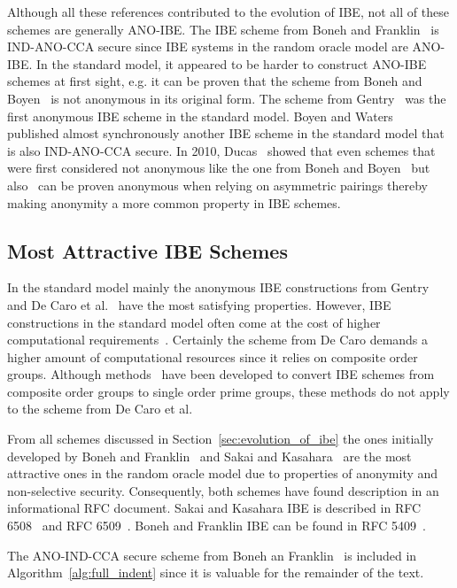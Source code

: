 Although all these references contributed to the evolution of IBE, not all of these schemes are generally ANO-IBE. The IBE scheme from Boneh and Franklin~\cite{art:BonehF01} is IND-ANO-CCA secure since IBE systems in the random oracle model are ANO-IBE. In the standard model, it appeared to be harder to construct ANO-IBE schemes at first sight, e.g. it can be proven that the scheme from Boneh and Boyen~\cite{art:BonehB04} is not anonymous in its original form. The scheme from Gentry~\cite{art:Gentry06} was the first anonymous IBE scheme in the standard model. Boyen and Waters~\cite{art:BoyenW06} published almost synchronously another IBE scheme in the standard model that is also IND-ANO-CCA secure. In 2010, Ducas~\cite{art:Ducas10} showed that even schemes that were first considered not anonymous like the one from Boneh and Boyen~\cite{art:BonehB04} but also~\cite{art:BonehBG05,art:Waters05} can be proven anonymous when relying on asymmetric pairings thereby making anonymity a more common property in IBE schemes.

\subsection{Most Attractive IBE Schemes}
In the standard model mainly the anonymous IBE constructions from Gentry~\cite{art:Gentry06} and De Caro et al.~\cite{art:CaroIP10} have the most satisfying properties. However, IBE constructions in the standard model often come at the cost of higher computational requirements~\cite{art:Boyen08}. Certainly the scheme from De Caro demands a higher amount of computational resources since it relies on composite order groups. Although methods~\cite{art:Freeman10,art:Lewko12} have been developed to convert IBE schemes from composite order groups to single order prime groups, these methods do not apply to the scheme from De Caro et al.~\cite{art:LeeL10}

From all schemes discussed in Section~\ref{sec:evolution_of_ibe} the ones initially developed by Boneh and Franklin~\cite{art:BonehF01} and Sakai and Kasahara~\cite{art:SakaiK03} are the most attractive ones in the random oracle model due to properties of anonymity and non-selective security. Consequently, both schemes have found description in an informational RFC document. Sakai and Kasahara IBE is described in RFC 6508~\cite{rfc6508} and RFC 6509~\cite{rfc6509}. Boneh and Franklin IBE can be found in RFC 5409~\cite{rfc5409}. 

The ANO-IND-CCA secure scheme from Boneh an Franklin~\cite{art:BonehF01} is included in Algorithm~\ref{alg:full_indent} since it is valuable for the remainder of the text.


